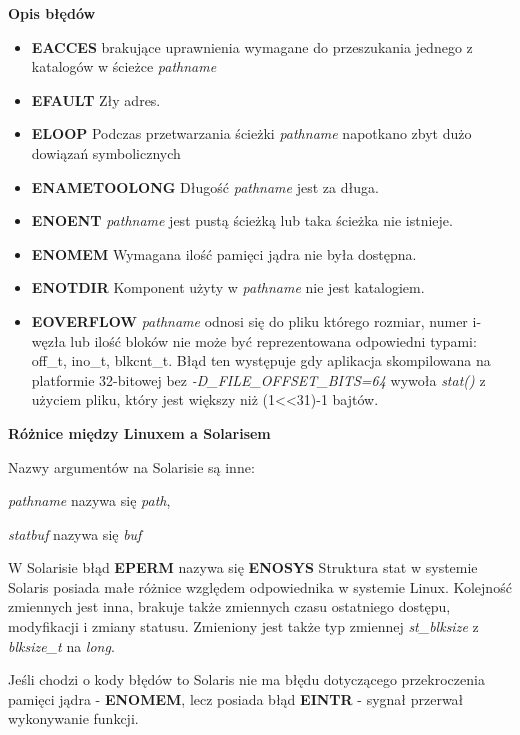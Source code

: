 \documentclass{article}
\begin{document}
\textbf{Opis błędów}
\begin{itemize}
\item \textbf{EACCES} brakujące uprawnienia wymagane do przeszukania jednego z katalogów w ścieżce \textit{pathname}
\item \textbf{EFAULT} Zły adres.
\item \textbf{ELOOP} Podczas przetwarzania ścieżki \textit{pathname} napotkano zbyt dużo dowiązań symbolicznych
\item \textbf{ENAMETOOLONG} Długość \textit{pathname} jest za długa.
\item \textbf{ENOENT} \textit{pathname} jest pustą ścieżką lub taka ścieżka nie istnieje.

\item \textbf{ENOMEM}  Wymagana ilość pamięci jądra nie była dostępna.
\item \textbf{ENOTDIR}  Komponent użyty w \textit{pathname} nie jest katalogiem.
\item \textbf{EOVERFLOW} \textit{pathname} odnosi się do pliku którego rozmiar, numer i-węzła lub ilość bloków nie może być reprezentowana odpowiedni typami: off\_t, ino\_t, blkcnt\_t. Błąd ten występuje gdy aplikacja skompilowana na platformie 32-bitowej bez \textit{-D\_FILE\_OFFSET\_BITS=64} wywoła \textit{stat()} z użyciem pliku, który jest większy niż (1<<31)-1 bajtów.



\end{itemize}
\textbf{Różnice między Linuxem a Solarisem}


Nazwy argumentów na Solarisie są inne:

\textit{pathname} nazywa się \textit{path},

\textit{statbuf} nazywa się \textit{buf}

W Solarisie  błąd \textbf{EPERM} nazywa się \textbf{ENOSYS}
Struktura stat w systemie Solaris posiada małe różnice względem odpowiednika w systemie Linux.
Kolejność zmiennych jest inna, brakuje także zmiennych czasu ostatniego dostępu, modyfikacji i zmiany statusu.
Zmieniony jest także typ zmiennej \textit{st\_blksize} z \textit{blksize\_t} na \textit{long}.

Jeśli chodzi o kody błędów to Solaris nie ma błędu dotyczącego przekroczenia pamięci jądra - \textbf{ENOMEM}, lecz posiada błąd \textbf{EINTR} - sygnał przerwał wykonywanie funkcji.
\end{document}
